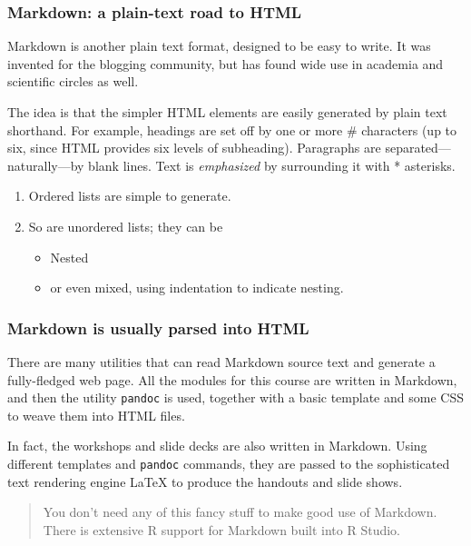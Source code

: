 \documentclass[11pt,ignorenonframetext,]{beamer}
\begin{document}
\begin{frame}\frametitle{Markdown: a plain-text road to HTML}

Markdown is another plain text format, designed to be easy to write. It
was invented for the blogging community, but has found wide use in
academia and scientific circles as well.

The idea is that the simpler HTML elements are easily generated by plain
text shorthand. For example, headings are set off by one or more \#
characters (up to six, since HTML provides six levels of subheading).
Paragraphs are separated---naturally---by blank lines. Text is
\emph{emphasized} by surrounding it with * asterisks.

\begin{enumerate}[<+->]
\def\labelenumi{\arabic{enumi}.}
\itemsep1pt\parskip0pt
\item
  Ordered lists are simple to generate.
\item
  So are unordered lists; they can be

  \begin{itemize}[<+->]
  \itemsep1pt\parskip0pt
  \item
    Nested
  \item
    or even mixed, using indentation to indicate nesting.
  \end{itemize}
\end{enumerate}

\end{frame}

\begin{frame}\frametitle{Markdown is usually parsed into HTML}

There are many utilities that can read Markdown source text and generate
a fully-fledged web page. All the modules for this course are written in
Markdown, and then the utility \texttt{pandoc} is used, together with a
basic template and some CSS to weave them into HTML files.

In fact, the workshops and slide decks are also written in Markdown.
Using different templates and \texttt{pandoc} commands, they are passed
to the sophisticated text rendering engine LaTeX to produce the handouts
and slide shows.

\begin{quote}
You don't need any of this fancy stuff to make good use of Markdown.
There is extensive R support for Markdown built into R Studio.
\end{quote}

\end{frame}
\end{document}
